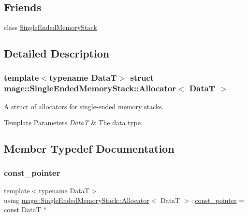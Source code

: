 \subsection*{Friends}
\begin{DoxyCompactItemize}
\item 
class \hyperlink{structmage_1_1_single_ended_memory_stack_1_1_allocator_a3f3449e5c2caa1666a293b36db6f5a54}{Single\+Ended\+Memory\+Stack}
\end{DoxyCompactItemize}


\subsection{Detailed Description}
\subsubsection*{template$<$typename DataT$>$\newline
struct mage\+::\+Single\+Ended\+Memory\+Stack\+::\+Allocator$<$ Data\+T $>$}

A struct of allocators for single-\/ended memory stacks.


\begin{DoxyTemplParams}{Template Parameters}
{\em DataT} & The data type. \\
\hline
\end{DoxyTemplParams}


\subsection{Member Typedef Documentation}
\hypertarget{structmage_1_1_single_ended_memory_stack_1_1_allocator_aaa595b8cfde6f045e5f87e5662b549f6}{}\label{structmage_1_1_single_ended_memory_stack_1_1_allocator_aaa595b8cfde6f045e5f87e5662b549f6} 
\subsubsection{\texorpdfstring{const\+\_\+pointer}{const\_pointer}}
{\footnotesize\ttfamily template$<$typename DataT$>$ \\
using \hyperlink{structmage_1_1_single_ended_memory_stack_1_1_allocator}{mage\+::\+Single\+Ended\+Memory\+Stack\+::\+Allocator}$<$ DataT $>$\+::\hyperlink{structmage_1_1_single_ended_memory_stack_1_1_allocator_aaa595b8cfde6f045e5f87e5662b549f6}{const\+\_\+pointer} =  const DataT $\ast$}

